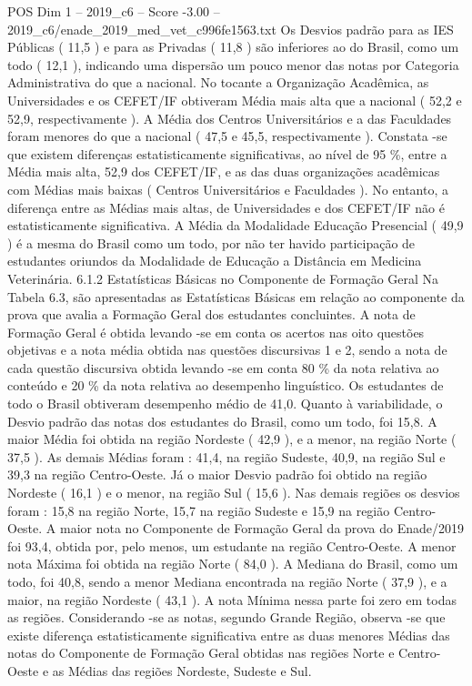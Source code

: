 \begin{textsample}{POS Dim 1 – 2019\_c6 – Score -3.00 – 2019\_c6/enade\_2019\_med\_vet\_c996fe1563.txt}
Os Desvios padrão para as IES Públicas ( 11,5 ) e para as Privadas ( 11,8 ) são inferiores ao do Brasil, como um todo ( 12,1 ), indicando uma dispersão um pouco menor das notas por Categoria Administrativa do que a nacional.
No tocante a Organização Acadêmica, as Universidades e os CEFET/IF obtiveram Média mais alta que a nacional ( 52,2 e 52,9, respectivamente ).
A Média dos Centros Universitários e a das Faculdades foram menores do que a nacional ( 47,5 e 45,5, respectivamente ).
Constata -se que existem diferenças estatisticamente significativas, ao nível de 95 \%, entre a Média mais alta, 52,9 dos CEFET/IF, e as das duas organizações acadêmicas com Médias mais baixas ( Centros Universitários e Faculdades ).
No entanto, a diferença entre as Médias mais altas, de Universidades e dos CEFET/IF não é estatisticamente significativa.
A Média da Modalidade Educação Presencial ( 49,9 ) é a mesma do Brasil como um todo, por não ter havido participação de estudantes oriundos da Modalidade de Educação a Distância em Medicina Veterinária. 6.1.2 Estatísticas Básicas no Componente de Formação Geral Na Tabela 6.3, são apresentadas as Estatísticas Básicas em relação ao componente da prova que avalia a Formação Geral dos estudantes concluintes.
A nota de Formação Geral é obtida levando -se em conta os acertos nas oito questões objetivas e a nota média obtida nas questões discursivas 1 e 2, sendo a nota de cada questão discursiva obtida levando -se em conta 80 \% da nota relativa ao conteúdo e 20 \% da nota relativa ao desempenho linguístico.
Os estudantes de todo o Brasil obtiveram desempenho médio de 41,0.
Quanto à variabilidade, o Desvio padrão das notas dos estudantes do Brasil, como um todo, foi 15,8.
A maior Média foi obtida na região Nordeste ( 42,9 ), e a menor, na região Norte ( 37,5 ).
As demais Médias foram : 41,4, na região Sudeste, 40,9, na região Sul e 39,3 na região Centro-Oeste.
Já o maior Desvio padrão foi obtido na região Nordeste ( 16,1 ) e o menor, na região Sul ( 15,6 ).
Nas demais regiões os desvios foram : 15,8 na região Norte, 15,7 na região Sudeste e 15,9 na região Centro-Oeste.
A maior nota no Componente de Formação Geral da prova do Enade/2019 foi 93,4, obtida por, pelo menos, um estudante na região Centro-Oeste.
A menor nota Máxima foi obtida na região Norte ( 84,0 ).
A Mediana do Brasil, como um todo, foi 40,8, sendo a menor Mediana encontrada na região Norte ( 37,9 ), e a maior, na região Nordeste ( 43,1 ).
A nota Mínima nessa parte foi zero em todas as regiões.
Considerando -se as notas, segundo Grande Região, observa -se que existe diferença estatisticamente significativa entre as duas menores Médias das notas do Componente de Formação Geral obtidas nas regiões Norte e Centro-Oeste e as Médias das regiões Nordeste, Sudeste e Sul.

\end{textsample}
